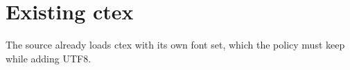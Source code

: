 \documentclass{article}
\begin{document}
\section{Existing ctex}
The source already loads ctex with its own font set, which the policy must keep while adding UTF8.
\end{document}

